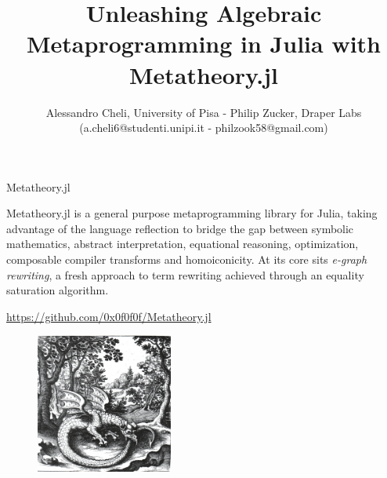 \documentclass[8pt]{beamer}  %
\title{{\color{aa}\Huge\adfbullet{9}}Unleashing Algebraic Metaprogramming in Julia with Metatheory.jl } %
\subtitle{Alessandro Cheli, University of Pisa - Philip Zucker, Draper Labs \\ \small{(a.cheli6@studenti.unipi.it - philzook58@gmail.com)}} %
\date{}
\begin{document}


\frame{\titlepage} %

\setlength{\abovedisplayskip}{0pt}
\setlength{\belowdisplayskip}{0pt}
\setlength{\abovedisplayshortskip}{0pt}
\setlength{\belowdisplayshortskip}{0pt}  %



\begin{frame}{Metatheory.jl}   %

\begin{multicols}{2}
Metatheory.jl  is a general purpose metaprogramming library for Julia, taking advantage of the language reflection to bridge the gap between symbolic mathematics, abstract interpretation, equational reasoning, optimization, composable compiler transforms and homoiconicity. At its core sits \textit{e-graph rewriting}, a fresh approach to term rewriting achieved through an equality saturation algorithm.

\textcolor{blue}{\href{https://github.com/0x0f0f0f/Metatheory.jl}{https://github.com/0x0f0f0f/Metatheory.jl}}

\columnbreak

\begin{figure}
    \centering
    \includegraphics[width=0.4\textwidth]{dragon.jpg}
    \label{fig:my_label}
\end{figure}


\end{multicols}

\end{frame}

\end{document}
